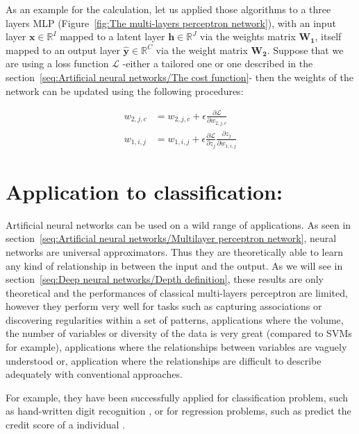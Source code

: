 \documentclass[a4paper,11pt]{report}
\begin{document}
		As an example for the calculation, let us applied those algorithms to a three layers MLP (Figure~\ref{fig:The multi-layers perceptron network}), with an input layer $\mathbf{x} \in \mathbb{R}^{I}$ mapped to a latent layer $\mathbf{h} \in \mathbb{R}^{J}$ via the weights matrix $\mathbf{W_{1}}$, itself mapped to an output layer $\mathbf{\hat{y}} \in \mathbb{R}^{C}$ via the weight matrix $\mathbf{W_{2}}$. Suppose that we are using a loss function $\mathcal{L}$ -either a tailored one or one described in the section~\ref{seq:Artificial neural networks/The cost function}- then the weights of the network can be updated using the following procedures:
		
		\begin{equation}
			\begin{split}
				w_{2,j,c} &= w_{2,j,c} + \epsilon \frac{\partial \mathcal{L}}{\partial w_{2,j,c}} \\
				w_{1,i,j} &= w_{1,i,j} + \epsilon \frac{\partial \mathcal{L}}{\partial z_{j}} \frac{\partial z_{j}}{\partial w_{1,i,j}}
			\end{split}
		\end{equation}
    
    
	\section{Application to classification:}
		\label{seq:Artificial neural networks/Applications and Limits}
		Artificial neural networks can be used on a wild range of applications. As seen in section~\ref{seq:Artificial neural networks/Multilayer perceptron network}, neural networks are universal approximators. Thus they are theoretically able to learn any kind of relationship in between the input and the output. As we will see in section~\ref{seq:Deep neural networks/Depth definition}, these results are only theoretical and the performances of classical multi-layers perceptron are limited, however they perform very well for tasks such as capturing associations or discovering regularities within a set of patterns, applications where the volume, the number of variables or diversity of the data is very great (compared to SVMs for example), applications where the relationships between variables are vaguely understood or, application where the relationships are difficult to describe adequately with conventional approaches. \\\par
    
		For example, they have been successfully applied for classification problem, such as hand-written digit recognition \cite{LeCun_webPage}, or for regression problems, such as predict the credit score of a individual \cite{West_2000}.
    
\end{document}
